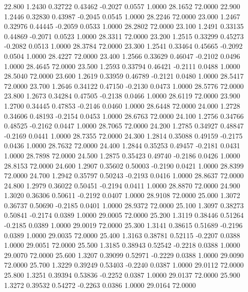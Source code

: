   22.800   1.2430   0.32722   0.43462  -0.2027   0.0557   1.0000  28.1652  72.0000
  22.900   1.2446   0.32830   0.43987  -0.2045   0.0545   1.0000  28.2246  72.0000
  23.000   1.2467   0.32976   0.44445  -0.2059   0.0533   1.0000  28.2802  72.0000
  23.100   1.2491   0.33135   0.44869  -0.2071   0.0523   1.0000  28.3311  72.0000
  23.200   1.2515   0.33299   0.45273  -0.2082   0.0513   1.0000  28.3784  72.0000
  23.300   1.2541   0.33464   0.45665  -0.2092   0.0504   1.0000  28.4227  72.0000
  23.400   1.2566   0.33629   0.46047  -0.2102   0.0496   1.0000  28.4645  72.0000
  23.500   1.2593   0.33794   0.46421  -0.2111   0.0488   1.0000  28.5040  72.0000
  23.600   1.2619   0.33959   0.46789  -0.2121   0.0480   1.0000  28.5417  72.0000
  23.700   1.2646   0.34122   0.47150  -0.2130   0.0473   1.0000  28.5776  72.0000
  23.800   1.2673   0.34284   0.47505  -0.2138   0.0466   1.0000  28.6119  72.0000
  23.900   1.2700   0.34445   0.47853  -0.2146   0.0460   1.0000  28.6448  72.0000
  24.000   1.2728   0.34606   0.48193  -0.2154   0.0453   1.0000  28.6763  72.0000
  24.100   1.2756   0.34766   0.48525  -0.2162   0.0447   1.0000  28.7065  72.0000
  24.200   1.2785   0.34927   0.48847  -0.2169   0.0441   1.0000  28.7355  72.0000
  24.300   1.2814   0.35088   0.49159  -0.2175   0.0436   1.0000  28.7632  72.0000
  24.400   1.2844   0.35253   0.49457  -0.2181   0.0431   1.0000  28.7898  72.0000
  24.500   1.2875   0.35423   0.49740  -0.2186   0.0426   1.0000  28.8153  72.0000
  24.600   1.2907   0.35602   0.50003  -0.2190   0.0421   1.0000  28.8399  72.0000
  24.700   1.2942   0.35797   0.50243  -0.2193   0.0416   1.0000  28.8637  72.0000
  24.800   1.2979   0.36022   0.50451  -0.2194   0.0411   1.0000  28.8870  72.0000
  24.900   1.3020   0.36306   0.50611  -0.2192   0.0407   1.0000  28.9108  72.0000
  25.000   1.3072   0.36737   0.50690  -0.2185   0.0401   1.0000  28.9372  72.0000
  25.100   1.3097   0.38273   0.50841  -0.2174   0.0389   1.0000  29.0005  72.0000
  25.200   1.3119   0.38446   0.51264  -0.2185   0.0389   1.0000  29.0019  72.0000
  25.300   1.3141   0.38615   0.51689  -0.2196   0.0389   1.0000  29.0035  72.0000
  25.400   1.3163   0.38781   0.52115  -0.2207   0.0388   1.0000  29.0051  72.0000
  25.500   1.3185   0.38943   0.52542  -0.2218   0.0388   1.0000  29.0070  72.0000
  25.600   1.3207   0.39099   0.52971  -0.2229   0.0388   1.0000  29.0090  72.0000
  25.700   1.3229   0.39249   0.53403  -0.2240   0.0387   1.0000  29.0112  72.0000
  25.800   1.3251   0.39394   0.53836  -0.2252   0.0387   1.0000  29.0137  72.0000
  25.900   1.3272   0.39532   0.54272  -0.2263   0.0386   1.0000  29.0164  72.0000
